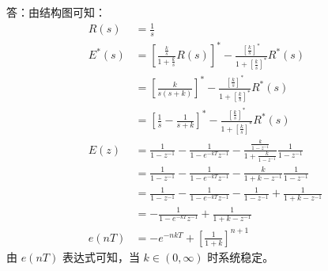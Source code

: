 \onlyanswer
{
	答：由结构图可知：
	\begin{align*}
	R(s) &= \frac{1}{s} \\
	E^*(s) &= \left[\frac{\frac{k}{s}}{1+\frac{k}{s}}R(s)\right]^*-\frac{[\frac{k}{s}]^*}{1+[\frac{k}{s}]^*}R^*(s) \\
	&= \left[\frac{k}{s(s+k)}\right]^* -\frac{[\frac{k}{s}]^*}{1+[\frac{k}{s}]^*}R^*(s) \\
	&= \left[\frac{1}{s}-\frac{1}{s+k}\right]^* -\frac{[\frac{k}{s}]^*}{1+[\frac{k}{s}]^*}R^*(s) \\
	E(z)  &=\frac{1}{1-z^{-1}}-\frac{1}{1-e^{-kT}z^{-1}}-\frac{\frac{k}{1-z^{-1}}}{1+\frac{k}{1-z^{-1}}}\frac{1}{1-z^{-1}} \\
	&=\frac{1}{1-z^{-1}}-\frac{1}{1-e^{-kT}z^{-1}}-\frac{k}{1+k-z^{-1}}\frac{1}{1-z^{-1}} \\
	&=\frac{1}{1-z^{-1}}-\frac{1}{1-e^{-kT}z^{-1}}-\frac{1}{1-z^{-1}}+\frac{1}{1+k-z^{-1}} \\
	&=-\frac{1}{1-e^{-kT}z^{-1}}+\frac{1}{1+k-z^{-1}} \\
	e(nT) &=-e^{-nkT}+\left[\frac{1}{1+k}\right]^{n+1}
	\end{align*}
	由 $e(nT)$ 表达式可知，当 $k\in(0,\infty)$ 时系统稳定。
}



